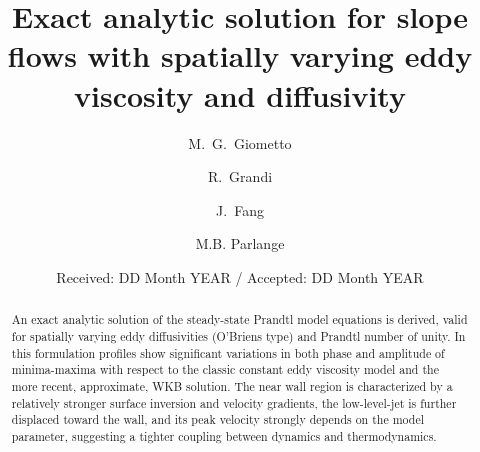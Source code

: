 

\title{Exact analytic solution for slope flows with spatially varying eddy viscosity and diffusivity}



\author{M.~G.~Giometto \and R.~Grandi\and J.~Fang \and M.B. Parlange}


\date{Received: DD Month YEAR / Accepted: DD Month YEAR}


\maketitle

\begin{abstract}
An exact analytic solution of the steady-state Prandtl model equations is derived, valid for spatially varying eddy diffusivities (O'Briens type) and Prandtl number of unity. 
In this formulation profiles show significant variations in both phase and amplitude of minima-maxima with respect to the classic constant eddy viscosity model and the more recent, approximate, WKB solution. 
The near wall region is characterized by a relatively stronger surface inversion and velocity gradients, the low-level-jet is further displaced toward the wall, and its peak velocity strongly depends on the model parameter, suggesting a tighter coupling between dynamics and thermodynamics.
\end{abstract}


